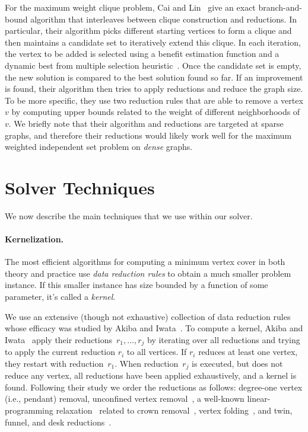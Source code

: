 \documentclass[twoside,leqno,twocolumn]{article}
\begin{document}
For the maximum weight clique problem, Cai and Lin~\cite{cai2016fast} give an exact branch-and-bound algorithm that interleaves between clique construction and reductions.
In particular, their algorithm picks different starting vertices to form a clique and then maintains a candidate set to iteratively extend this clique.
In each iteration, the vertex to be added is selected using a benefit estimation function and a dynamic best from multiple selection heuristic~\cite{cai2015balance}.
Once the candidate set is empty, the new solution is compared to the best solution found so far.
If an improvement is found, their algorithm then tries to apply reductions and reduce the graph size.
To be more specific, they use two reduction rules that are able to remove a vertex $v$ by computing upper bounds related to the weight of different neighborhoods of $v$. 
We briefly note that their algorithm and reductions are targeted at sparse graphs, and therefore their reductions would likely work well for the maximum weighted independent set problem on \emph{dense} graphs.


\section{Solver Techniques}
We now describe the main techniques that we use within our solver.
\paragraph*{Kernelization.}
The most efficient algorithms for computing a minimum vertex cover in both theory and practice use \emph{data reduction rules} to obtain a much smaller problem instance. If this smaller instance has size bounded by a function of some parameter, it's called a \emph{kernel}. 

We use an extensive (though not exhaustive) collection of data reduction rules whose efficacy was studied by Akiba and Iwata~\cite{akiba-tcs-2016}. To compute a kernel, Akiba and Iwata~\cite{akiba-tcs-2016} apply their
reductions~$r_1, \dots, r_j$ by iterating over all reductions and trying to
apply the current reduction $r_i$ to all vertices. If $r_i$ reduces at
least one vertex, they restart with reduction~$r_1$. When reduction~$r_j$ 
is executed, but does not reduce any vertex, all reductions have been applied
exhaustively, and a kernel is found. Following their study we order the reductions
as follows: degree-one vertex (i.e., pendant) removal, unconfined vertex removal~\cite{Xiao201392}, a well-known linear-programming 
relaxation~\cite{iwata-2014,nemhauser-1975} related to crown removal~\cite{abu-khzam-2007}, vertex folding~\cite{chen-1999}, and twin, funnel, and desk reductions~\cite{Xiao201392}.
\end{document}
